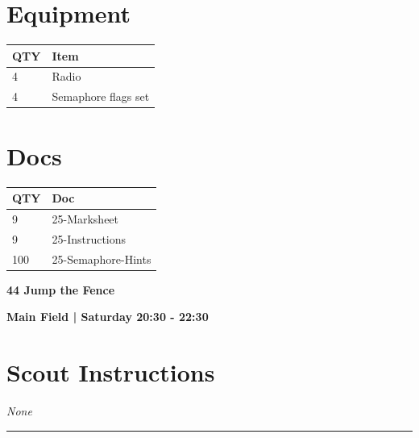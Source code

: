 \documentclass[10pt]{article}
\newcommand{\newtitle}[1]{\begin{center}{\Huge\bfseries #1 }\\ \vspace{5mm}\end{center}}
\newcommand{\newsubtitle}[1]{\begin{center}{\color{grey}\Large\bfseries #1 }\\ \vspace{5mm}\end{center}}
\begin{document}
	\begin{multicols}{2}

		\section*{\faWrench \: Equipment}

		
	\begin{center}
			\begin{tabular}{p{2cm}p{4cm}}


				\textbf{QTY} & \textbf{Item} \\\toprule
												4&Radio\\\midrule
												4&Semaphore flags set\\\midrule
								\end{tabular}

			\end{center}

		
		\vfill\null
		\columnbreak

			\section*{\faFile \: Docs}
		 	\begin{center}
			\begin{tabular}{p{2cm}p{4cm}}

			\textbf{QTY} & \textbf{Doc} \\\toprule
										9&25-Marksheet\\\midrule
										9&25-Instructions\\\midrule
										100&25-Semaphore-Hints\\\midrule
							\end{tabular}
			\end{center}
	

		\vfill\null

		\end{multicols}



	\vspace{1cm}


	\clearpage
		\newtitle{44 Jump the Fence }
	\newsubtitle{Main Field | Saturday 20:30 - 22:30}
		\setcounter{section}{43}
	\section*{Scout Instructions}
		\textit{None}
	
	\vspace{0.5cm}
	\hrule
	\vspace{0.5cm}
\end{document}
